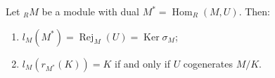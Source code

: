 Let ${}_R M$ be a module with dual $M^* = \operatorname{Hom}_R(M, U)$. Then:

\begin{enumerate}
\item[(1)] $l_M(M^*) = \operatorname{Rej}_M(U) = \operatorname{Ker} \sigma_M$;
\item[(2)] $l_M(r_{M^*}(K)) = K$ if and only if $U$ cogenerates $M/K$.
\end{enumerate}
